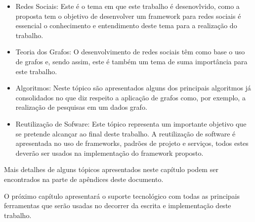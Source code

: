 \begin{itemize}
	\item Redes Sociais: Este é o tema em que este trabalho é desenovlvido, como a proposta tem o objetivo de desenvolver um framework para redes sociais é essencial o conhecimento e entendimento deste tema para a realização do trabalho.
	\item Teoria dos Grafos: O desenvolvimento de redes sociais têm como base o uso de grafos e, sendo assim, este é também um tema de suma importância para este trabalho.
	\item Algoritmos: Neste tópico são apresentados alguns dos principais algoritmos já consolidados no que diz respeito a aplicação de grafos como, por exemplo, a realização de pesquisas em um dados grafo.
	\item Reutilização de Sofware: Este tópico representa um importante objetivo que se pretende alcançar ao final deste trabalho. A reutilização de software é apresentada no uso de frameworks, padrões de projeto e serviços, todos estes deverão ser usados na implementação do framework proposto.
\end{itemize}

Mais detalhes de alguns tópicos apresentados neste capítulo podem ser encontrados na parte de apêndices deste documento.

O próximo capítulo apresentará o suporte tecnológico com todas as principais ferramentas que serão usadas no decorrer da escrita e implementação deste trabalho.
